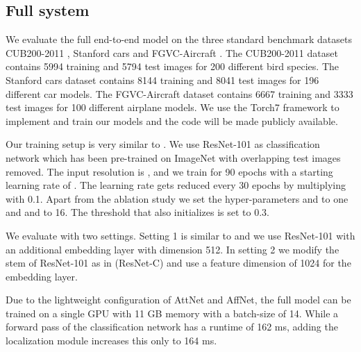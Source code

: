 \documentclass{bmvc2k}
\begin{document}
\subsection{Full system}
We evaluate the full end-to-end model on the three standard benchmark datasets CUB200-2011 \cite{birds}, Stanford cars \cite{cars} and FGVC-Aircraft \cite{aircraft}. The CUB200-2011 dataset contains 5994 training and 5794 test images for 200 different bird species. The Stanford cars dataset contains 8144 training and 8041 test images for 196 different car models. The FGVC-Aircraft dataset contains 6667 training and 3333 test images for 100 different airplane models. We use the Torch7 framework \cite{collobert2011torch7} to implement and train our models and the code will be made publicly available.

Our training setup is very similar to \cite{Hanselmann_2020_WACV}. We use ResNet-101 \cite{he2016deep} as classification network which has been pre-trained on ImageNet \cite{he2016deep} with overlapping test images removed. The input resolution is , and we train for 90 epochs with a starting learning rate of . The learning rate gets reduced every 30 epochs by multiplying with 0.1. Apart from the ablation study we set the hyper-parameters  and  to one and  and  to 16. The threshold  that also initializes  is set to 0.3.

We evaluate with two settings. Setting 1 is similar to \cite{Hanselmann_2020_WACV} and we use ResNet-101 with an additional embedding layer with dimension 512. In setting 2 we modify the stem of ResNet-101 as in \cite{he2019bag} (ResNet-C) and use a feature dimension of 1024 for the embedding layer.

Due to the lightweight configuration of AttNet and AffNet, the full model can be trained on a single GPU with 11 GB memory with a batch-size of 14. While a forward pass of the classification network has a runtime of 162 ms, adding the localization module increases this only to 164 ms.
\end{document}
